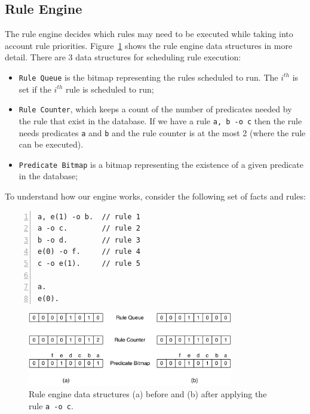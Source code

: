 
\subsection{Rule Engine}
\label{sec:implementation:rule_engine}

The rule engine decides which rules may need to be executed while taking into
account rule priorities. Figure~\ref{fig:implementation:rule_engine} shows the
rule engine data structures in more detail. There are 3 data structures for
scheduling rule execution:

\begin{itemize}

   \item \texttt{Rule Queue} is the bitmap representing the rules scheduled to
      run. The $i^{th}$ is set if the $i^{th}$ rule is scheduled to run;

   \item \texttt{Rule Counter}, which keeps a count of the number of predicates
      needed by the rule that exist in the database. If we have a rule
      \texttt{a, b -o c} then the rule needs predicates \texttt{a} and
      \texttt{b} and the rule counter is at the most 2 (where the rule can be
      executed).

   \item \texttt{Predicate Bitmap} is a bitmap representing the existence of a
      given predicate in the database;

\end{itemize}

To understand how our engine works, consider the following set of
facts and rules:

\begin{Verbatim}[numbers=left]
a, e(1) -o b.  // rule 1
a -o c.        // rule 2
b -o d.        // rule 3
e(0) -o f.     // rule 4
c -o e(1).     // rule 5

a.
e(0).
\end{Verbatim}

\begin{figure}[t]
\centering
\includegraphics[width=0.8\textwidth]{figures/implementation/rule_queue.pdf}
\caption{Rule engine data structures (a) before and (b) after applying 
   the rule \texttt{a -o c}.}
\label{fig:implementation:rule_engine}
\end{figure}

